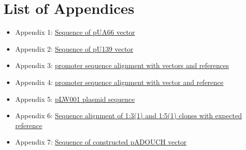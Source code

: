 \chapter*{List of Appendices}

\begin{itemize}[label={}]
\item Appendix 1: \hypertarget{pUA66seq}{\href{https://drive.google.com/open?id=1oHOr45i53oj1ZvaJO2rwhhKW336-1qDa}{Sequence of pUA66 vector}}
\item Appendix 2: \hypertarget{p139seq}{\href{https://drive.google.com/open?id=1eTZO0u8nTtbIphnsHlNvB4G_L2-LnJ-f}{Sequence of pU139 vector}}
\item Appendix 3: \hypertarget{placZalign}{\href{https://drive.google.com/open?id=1uxseqbHVccpsxmKUuVl5_nBY2wEvpF8J}{ promoter sequence alignment with vectors and references}}
\item Appendix 4: \hypertarget{precAalign}{\href{https://drive.google.com/open?id=1g5AUZ4vEhNVGWuKy9A7augQ2beI5EW9o}{ promoter sequence alignment with vector and reference}}
\item Appendix 5: \hypertarget{pLW001}{\href{https://drive.google.com/open?id=1HhTVjaBZxkOQPb05qaPJYQk1XmyXM7zO}{pLW001 plasmid sequence}}
\item Appendix 6: \hypertarget{pADOUCHseq}{\href{https://drive.google.com/open?id=1RT7LigW9waKPSw4mTKGJVCJavP3P0kWW}{Sequence alignment of 1:3(1) and 1:5(1) clones with expected reference}}
\item Appendix 7: \hypertarget{pADOUCHwhole}{\href{https://drive.google.com/open?id=1kS7Ih-cgBlwvxuMc4spGqSF4MdvcVV9f}{Sequence of constructed pADOUCH vector}}
\end{itemize}



